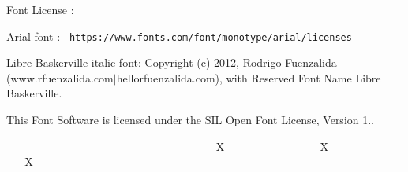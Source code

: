 

Font License \+:

Arial font \+: \href{https://www.fonts.com/font/monotype/arial/licenses}{\texttt{ https\+://www.\+fonts.\+com/font/monotype/arial/licenses}}

Libre Baskerville italic font\+: Copyright (c) 2012, Rodrigo Fuenzalida (www.\+rfuenzalida.\+com$\vert$hello{\ucr}rfuenzalida.com), with Reserved Font Name Libre Baskerville.

This Font Software is licensed under the SIL Open Font License, Version 1.. 


-\/-\/-\/-\/-\/-\/-\/-\/-\/-\/-\/-\/-\/-\/-\/-\/-\/-\/-\/-\/-\/-\/-\/-\/-\/-\/-\/-\/-\/-\/-\/-\/-\/-\/-\/-\/-\/-\/-\/-\/-\/-\/-\/-\/-\/-\/-\/-\/-\/-\/-\/-\/-\/-\/---X-\/-\/-\/-\/-\/-\/-\/-\/-\/-\/-\/-\/-\/-\/-\/-\/-\/-\/-\/-\/-\/-\/-\/---X-\/-\/-\/-\/-\/-\/-\/-\/-\/-\/-\/-\/-\/-\/-\/-\/-\/-\/-\/-\/-\/-\/---X-\/-\/-\/-\/-\/-\/-\/-\/-\/-\/-\/-\/-\/-\/-\/-\/-\/-\/-\/-\/-\/-\/-\/-\/-\/-\/-\/-\/-\/-\/-\/-\/-\/-\/-\/-\/-\/-\/-\/-\/-\/-\/-\/-\/-\/-\/-\/-\/-\/-\/-\/-\/-\/-\/-\/-\/-\/-\/-\/-\/--- 